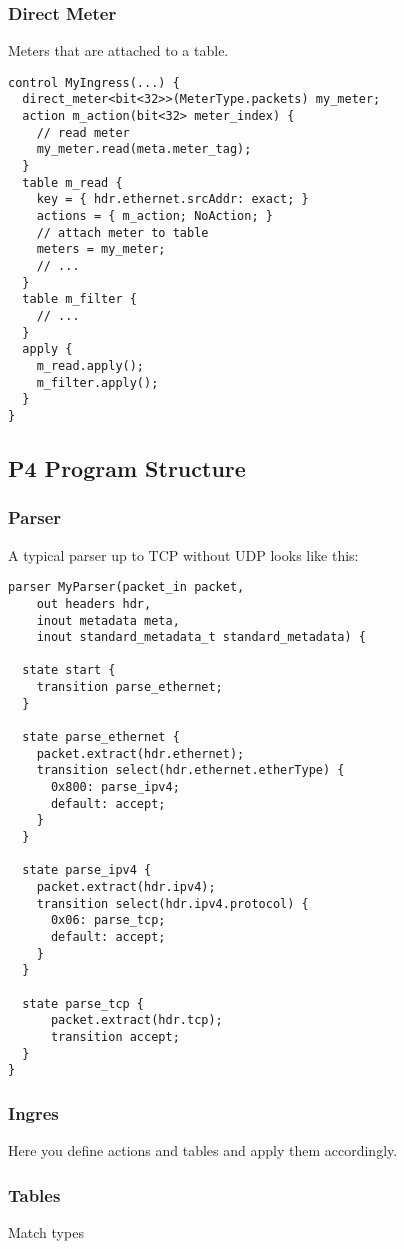 \documentclass[a4paper, fontsize=8pt, landscape, DIV=1]{scrartcl}
\begin{document}
\begin{multicols*}{3}
  \subsubsection{Direct Meter}
  Meters that are attached to a table.
  \begin{lstlisting}[style=P4style]
control MyIngress(...) {
  direct_meter<bit<32>>(MeterType.packets) my_meter;
  action m_action(bit<32> meter_index) {
    // read meter
    my_meter.read(meta.meter_tag);
  }
  table m_read {
    key = { hdr.ethernet.srcAddr: exact; }
    actions = { m_action; NoAction; }
    // attach meter to table
    meters = my_meter;
    // ...
  }
  table m_filter {
    // ...
  }
  apply {
    m_read.apply();
    m_filter.apply();
  }
} \end{lstlisting}


\subsection{P4 Program Structure}
  \subsubsection{Parser}
  A typical parser up to TCP without UDP looks like this:
  \begin{lstlisting}[style=P4style]
parser MyParser(packet_in packet,
    out headers hdr,
    inout metadata meta,
    inout standard_metadata_t standard_metadata) {

  state start {
    transition parse_ethernet;
  }

  state parse_ethernet {
    packet.extract(hdr.ethernet);
    transition select(hdr.ethernet.etherType) {
      0x800: parse_ipv4;
      default: accept;
    }
  }

  state parse_ipv4 {
    packet.extract(hdr.ipv4);
    transition select(hdr.ipv4.protocol) {
      0x06: parse_tcp;
      default: accept;
    } 
  }

  state parse_tcp {
      packet.extract(hdr.tcp);
      transition accept;
  }
}\end{lstlisting}

  \subsubsection{Ingres}
  Here you define actions and tables and apply them accordingly.

  \subsubsection{Tables}
  Match types


\end{multicols*}
\end{document}
